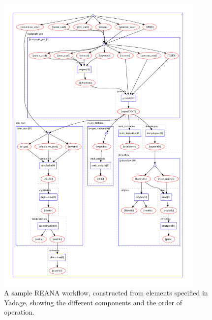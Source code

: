 \documentclass[11pt]{article}
\begin{document}
\begin{figure}[bthp]
    \centering
 \includegraphics[width=0.9\textwidth]{yadage_workflow_instance.pdf}
    \caption{A sample REANA workflow, constructed from elements specified in Yadage, showing the different components and the order of operation.}
    \label{fig:workflow}
\end{figure}
\end{document}

